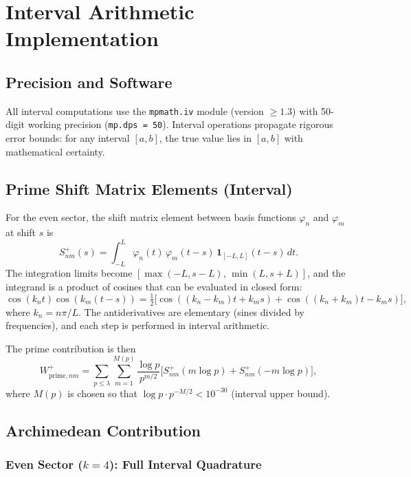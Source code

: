\documentclass[12pt,a4paper]{article}
\theoremstyle{definition}
\theoremstyle{remark}
\begin{document}
\section{Interval Arithmetic Implementation}
\label{sec:implementation}

\subsection{Precision and Software}

All interval computations use the \texttt{mpmath.iv} module (version $\geq 1.3$) with 50-digit working precision (\texttt{mp.dps = 50}). Interval operations propagate rigorous error bounds: for any interval $[a,b]$, the true value lies in $[a,b]$ with mathematical certainty.

\subsection{Prime Shift Matrix Elements (Interval)}

For the even sector, the shift matrix element between basis functions $\varphi_n$ and $\varphi_m$ at shift $s$ is
\[
S_{nm}^+(s) = \int_{-L}^{L} \varphi_n(t)\,\varphi_m(t-s)\,\mathbf{1}_{[-L,L]}(t-s)\,dt.
\]
The integration limits become $[\max(-L, s-L),\, \min(L, s+L)]$, and the integrand is a product of cosines that can be evaluated in closed form:
\[
\cos(k_n t)\cos(k_m(t-s)) = \tfrac{1}{2}\bigl[\cos((k_n - k_m)t + k_m s) + \cos((k_n + k_m)t - k_m s)\bigr],
\]
where $k_n = n\pi/L$. The antiderivatives are elementary (sines divided by frequencies), and each step is performed in interval arithmetic.

The prime contribution is then
\[
W_{\mathrm{prime},nm}^+ = \sum_{p \leq \lambda} \sum_{m=1}^{M(p)} \frac{\log p}{p^{m/2}} \bigl[S_{nm}^+(m\log p) + S_{nm}^+(-m\log p)\bigr],
\]
where $M(p)$ is chosen so that $\log p \cdot p^{-M/2} < 10^{-30}$ (interval upper bound).

\subsection{Archimedean Contribution}

\subsubsection{Even Sector ($k=4$): Full Interval Quadrature}
\end{document}
